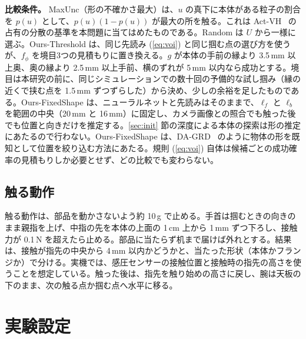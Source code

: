 \documentclass[conference]{IEEEtran}
\newcommand{\Unc}{MaxUnc}
\newcommand{\Rand}{Random}
\newcommand{\Geom}{Ours-Threshold}
\newcommand{\Fix}{Ours-FixedShape}
\begin{document}
\textbf{比較条件。} \Unc{}（形の不確かさ最大）は、$u$ の真下に本体がある粒子の割合を $p(u)$ として、$p(u)(1-p(u))$ が最大の所を触る。これは Act-VH~\cite{rustler2022actvh} の占有の分散の基準を本問題に当てはめたものである。\Rand{} は $U$ から一様に選ぶ。\Geom{} は、同じ先読み (\ref{eq:voi}) と同じ掴む点の選び方を使うが、$f_\phi$ を境目3つの見積もりに置き換える。$g$ が本体の手前の縁より 3.5\,mm 以上奥、奥の縁より 2.5\,mm 以上手前、横のずれが 5\,mm 以内なら成功とする。境目は本研究の前に、同じシミュレーションでの数十回の予備的な試し掴み（縁の近くで挟む点を 1.5\,mm ずつずらした）から決め、少しの余裕を足したものである。\Fix{} は、ニューラルネットと先読みはそのままで、$\ell_f$ と $\ell_b$ を範囲の中央（20\,mm と 16\,mm）に固定し、カメラ画像との照合でも触った後でも位置と向きだけを推定する。\ref{sec:init} 節の深度による本体の探索は形の推定にあたるので行わない。\Fix{} は、DA-GRD~\cite{wang2026dagrd} のように物体の形を既知として位置を絞り込む方法にあたる。規則 (\ref{eq:voi}) 自体は候補ごとの成功確率の見積もりしか必要とせず、どの比較でも変わらない。

\subsection{触る動作}\label{sec:touchmotion}
触る動作は、部品を動かさないよう約 10\,g で止める。手首は掴むときの向きのまま親指を上げ、中指の先を本体の上面の 1\,cm 上から 1\,mm ずつ下ろし、接触力が 0.1\,N を超えたら止める。部品に当たらず机まで届けば外れとする。結果は、接触が指先の中央から 4\,mm 以内かどうかと、当たった形状（本体かフランジか）で分ける。実機では、感圧センサーの接触位置と接触時の指先の高さを使うことを想定している。触った後は、指先を触り始めの高さに戻し、腕は天板の下のまま、次の触る点か掴む点へ水平に移る。

\section{実験設定}\label{sec:setup}
\end{document}
